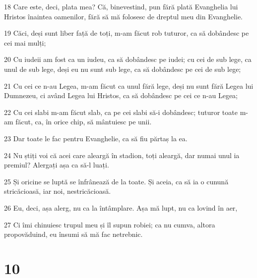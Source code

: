 \par 18 Care este, deci, plata mea? Că, binevestind, pun fără plată Evanghelia lui Hristos înaintea oamenilor, fără să mă folosesc de dreptul meu din Evanghelie.
\par 19 Căci, deși sunt liber față de toți, m-am făcut rob tuturor, ca să dobândesc pe cei mai mulți;
\par 20 Cu iudeii am fost ca un iudeu, ca să dobândesc pe iudei; cu cei de sub lege, ca unul de sub lege, deși eu nu sunt sub lege, ca să dobândesc pe cei de sub lege;
\par 21 Cu cei ce n-au Legea, m-am făcut ca unul fără lege, deși nu sunt fără Legea lui Dumnezeu, ci având Legea lui Hristos, ca să dobândesc pe cei ce n-au Legea;
\par 22 Cu cei slabi m-am făcut slab, ca pe cei slabi să-i dobândesc; tuturor toate m-am făcut, ca, în orice chip, să mântuiesc pe unii.
\par 23 Dar toate le fac pentru Evanghelie, ca să fiu părtaș la ea.
\par 24 Nu știți voi că acei care aleargă în stadion, toți aleargă, dar numai unul ia premiul? Alergați așa ca să-l luați.
\par 25 Și oricine se luptă se înfrânează de la toate. Și aceia, ca să ia o cunună stricăcioasă, iar noi, nestricăcioasă.
\par 26 Eu, deci, așa alerg, nu ca la întâmplare. Așa mă lupt, nu ca lovind în aer,
\par 27 Ci îmi chinuiesc trupul meu și îl supun robiei; ca nu cumva, altora propovăduind, eu însumi să mă fac netrebnic.

\chapter{10}

